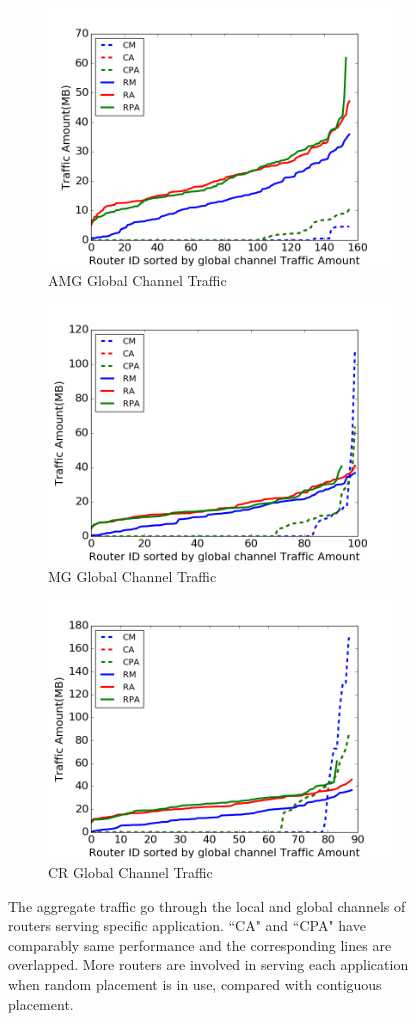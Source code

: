 \documentclass[conference,compsoc]{IEEEtran}
\begin{document}
\begin{figure}[t]
\begin{subfigure}[t]{0.32\textwidth}
        \includegraphics[height=1.8 in]{wkld/amg/gc-traffic}
        \caption{AMG Global Channel Traffic}
        \label{fig:amg-gc-traffic}
    \end{subfigure}\hfill
    \hspace{1em}%
    \begin{subfigure}[t]{0.32\textwidth}
        \centering
        \includegraphics[height=1.8 in]{wkld/mg/gc-traffic}
        \caption{MG Global Channel Traffic}
        \label{fig:mg-gc-traffic}
    \end{subfigure}\hfill
    \begin{subfigure}[t]{0.32\textwidth}
        \centering
        \includegraphics[height=1.8 in]{wkld/cr/gc-traffic}
        \caption{CR Global Channel Traffic}
        \label{fig:cr-gc-traffic}
    \end{subfigure}%
   \caption{The aggregate traffic go through the local and global channels of routers serving specific application. ``CA" and ``CPA" have comparably same performance and the corresponding lines are overlapped. More routers are involved in serving each application when random placement is in use, compared with contiguous placement.}
   \label{fig:3app-lc-gc-traffic}
\end{figure}
\end{document}
